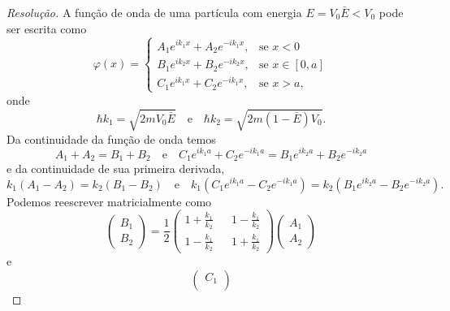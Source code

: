 \begin{proof}[Resolução]
    A função de onda de uma partícula com energia \(E = V_0 \bar{E} < V_0\) pode ser escrita como
    \begin{equation*}
        \varphi(x) = \begin{cases}
            A_1 e^{i k_1 x} + A_2 e^{-i k_1 x},&\text{se }x < 0\\
            B_1 e^{i k_2 x} + B_2 e^{-i k_2 x},&\text{se }x \in [0,a]\\
            C_1 e^{i k_1 x} + C_2 e^{-i k_1 x},&\text{se }x > a,
        \end{cases}
    \end{equation*}
    onde
    \begin{equation*}
        \hbar k_1 = \sqrt{2m V_0 \bar{E}} \quad\text{e}\quad \hbar k_2 = \sqrt{2 m (1 - \bar{E})V_0}.
    \end{equation*}
    Da continuidade da função de onda temos
    \begin{equation*}
        A_1 + A_2 = B_1 + B_2
        \quad\text{e}\quad
        C_1 e^{i k_1 a} + C_2 e^{-ik_1 a} = B_1 e^{ik_2 a} + B_2 e^{-ik_2 a}
    \end{equation*}
    e da continuidade de sua primeira derivada,
    \begin{equation*}
        k_1(A_1 - A_2 ) = k_2(B_1  - B_2 )
        \quad\text{e}\quad
        k_1(C_1 e^{i k_1 a} - C_2 e^{-ik_1 a}) = k_2(B_1 e^{ik_2 a} - B_2 e^{-ik_2 a}).
    \end{equation*}
    Podemos reescrever matricialmente como
    \begin{equation*}
        \begin{pmatrix}
            B_1 \\
            B_2
        \end{pmatrix} = \frac12
        \begin{pmatrix}
            1 + \frac{k_1}{k_2} &&
            1 - \frac{k_1}{k_2} \\
            1 - \frac{k_1}{k_2} &&
            1 + \frac{k_1}{k_2}
        \end{pmatrix}
        \begin{pmatrix}
            A_1\\
            A_2
        \end{pmatrix}
    \end{equation*}
    e
    \begin{equation*}
        \begin{pmatrix}
            C_1\\

\end{pmatrix}
\end{equation*}
\end{proof}
